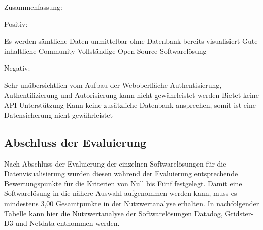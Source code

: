 Zusammenfassung:

Positiv:

\begin{outline}
  \1 Es werden sämtliche Daten unmittelbar ohne Datenbank bereits visualisiert
  \1 Gute inhaltliche Community
  \1 Vollständige Open-Source-Softwarelösung
\end{outline}

Negativ:

\begin{outline}
  \1 Sehr unübersichtlich vom Aufbau der Weboberfläche
  \1 Authentisierung, Authentifizierung und Autorisierung kann nicht
  gewährleistet werden
  \1 Bietet keine API-Unterstützung
  \1 Kann keine zusätzliche Datenbank ansprechen, somit ist eine Datensicherung
  nicht gewährleistet
\end{outline}
\mr%

\subsection{Abschluss der Evaluierung}
\label{subsec:abschluss_evaluierung}
Nach Abschluss der Evaluierung der einzelnen Softwarelösungen für die
Datenvisualisierung wurden diesen während der Evaluierung entsprechende
Bewertungspunkte für die Kriterien von Null bis Fünf festgelegt. Damit eine
Softwarelösung in die nähere Auswahl aufgenommen werden kann, muss es
mindestens 3,00 Gesamtpunkte in der Nutzwertanalyse erhalten. In
nachfolgender Tabelle kann hier die Nutzwertanalyse der Softwarelösungen
Datadog, Gridster-D3 und Netdata entnommen werden.

